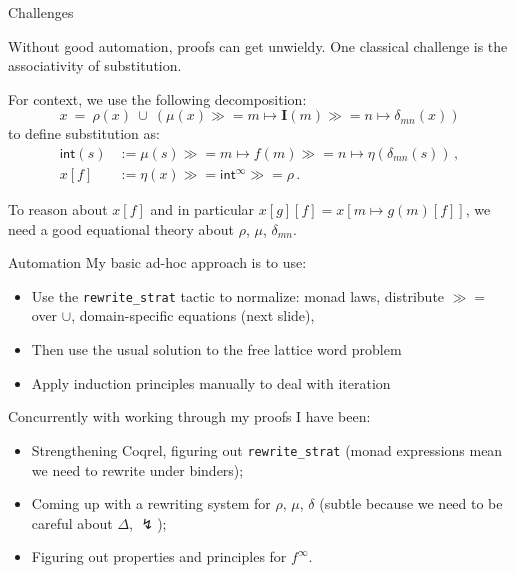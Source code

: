 \documentclass{beamer}
\newcommand{\bind}{\gg\!\!=}
\begin{document}
\begin{frame}{Challenges} %

Without good automation,
proofs can get unwieldy.
One classical challenge is
the associativity of substitution.
\vfill

For context, we use the following decomposition:
\[
    x \: = \: \rho(x) \: \cup \:
        (\mu(x) \bind m \mapsto \mathbf{I}(m) \bind n \mapsto \delta_{mn}(x))
\]
to define substitution as:
\begin{align*}
    \mathsf{int}(s) &:= 
      \mu(s) \bind m \mapsto f(m) \bind n \mapsto \eta(\delta_{mn}(s)) \,, \\
    x[f] &:=
      \eta(x) \bind \mathsf{int}^\infty \bind \rho \,.
\end{align*}
\vfill

To reason about $x[f]$ and
in particular $x[g][f] = x[m \mapsto g(m)[f]]$,
we need a good equational theory about $\rho$, $\mu$, $\delta_{mn}$.
\vfill

\end{frame}

\begin{frame}{Automation} %
My basic ad-hoc approach is to use:
\begin{itemize}
\item Use the \texttt{rewrite\_strat} tactic to normalize:
  monad laws,
  distribute $\bind$ over $\cup$,
  domain-specific equations (next slide),
\item
  Then use the usual solution to the
  free lattice word problem
\item
  Apply induction principles manually
  to deal with iteration
\end{itemize}
\vfill

Concurrently with working through my proofs
I have been:
\begin{itemize}
\item Strengthening Coqrel, figuring out \texttt{rewrite\_strat}
  (monad expressions mean we need to rewrite under binders);
\item Coming up with a rewriting system for $\rho$, $\mu$, $\delta$
  (subtle because we need to be careful about $\Delta$, $\lightning$);
\item Figuring out properties and principles for $f^\infty$.
\end{itemize}
\vfill

\end{frame}
\end{document}
